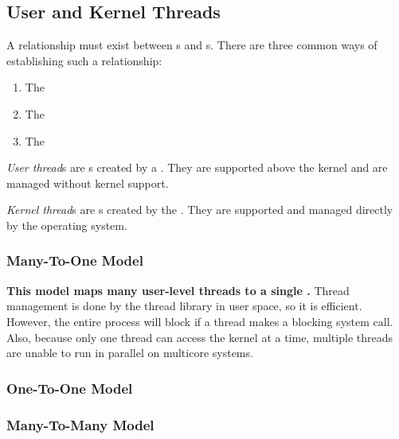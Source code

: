 \subsection{User and Kernel Threads}\label{subsec:User_Kernel_Threads}
A relationship must exist between s and s.
There are three common ways of establishing such a relationship:
\begin{enumerate}[noitemsep]
\item The 
\item The 
\item The 
\end{enumerate}

\begin{definition}\label{def:User_Thread}
  \emph{User thread}s are s created by a  .
  They are supported above the kernel and are managed without kernel support.
\end{definition}

\begin{definition}\label{def:Kernel_Thread}
  \emph{Kernel thread}s are s created by the .
  They are supported and managed directly by the operating system.
\end{definition}

\subsubsection{Many-To-One Model}\label{subsubsec:Many_To_One_Model}
\textbf{This model maps many user-level threads to a single .}
Thread management is done by the thread library in user space, so it is efficient.
However, the entire process will block if a thread makes a blocking system call.
Also, because only one thread can access the kernel at a time, multiple threads are unable to run in parallel on multicore systems.

\subsubsection{One-To-One Model}\label{subsubsec:One_To_One_Model}
\subsubsection{Many-To-Many Model}\label{subsubsec:Many_To_Many_Model}

